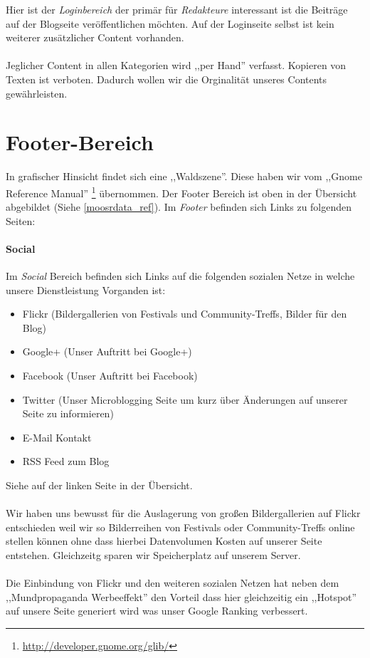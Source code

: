 Hier ist der \emph{Loginbereich} der primär für \emph{Redakteure} interessant
ist die Beiträge auf der Blogseite veröffentlichen möchten. Auf der Loginseite
selbst ist kein weiterer zusätzlicher Content vorhanden.
\\
\\
Jeglicher Content in allen Kategorien wird ,,per Hand'' verfasst. Kopieren von
Texten ist verboten. Dadurch wollen wir die Orginalität unseres Contents
gewährleisten.

\section{Footer-Bereich}
In grafischer Hinsicht findet sich eine ,,Waldszene''. Diese haben wir vom 
,,Gnome Reference Manual'' \footnote{\url{http://developer.gnome.org/glib/}} übernommen.
Der Footer Bereich ist oben in der Übersicht abgebildet (Siehe
\ref{moosrdata_ref}).
Im \emph{Footer} befinden sich Links zu folgenden Seiten:

\paragraph{Social}
Im \emph{Social} Bereich befinden sich Links auf die folgenden sozialen Netze in
welche unsere Dienstleistung Vorganden ist:
\begin{itemize}
\item Flickr (Bildergallerien von Festivals und Community-Treffs, Bilder für den
    Blog)
\item Google+ (Unser Auftritt bei Google+)
\item Facebook (Unser Auftritt bei Facebook)
\item Twitter (Unser Microblogging Seite um kurz über Änderungen auf unserer
Seite zu informieren)
\item E-Mail Kontakt
\item RSS Feed zum Blog
\end{itemize}

Siehe auf der linken Seite in der Übersicht.
\\
\\
Wir haben uns bewusst für die Auslagerung von großen Bildergallerien auf Flickr
entschieden weil wir so Bilderreihen von Festivals oder Community-Treffs online
stellen können ohne dass hierbei Datenvolumen Kosten auf unserer Seite
entstehen. Gleichzeitg sparen wir Speicherplatz auf unserem Server.
\\
\\
Die Einbindung von Flickr und den weiteren sozialen Netzen hat neben dem
,,Mundpropaganda Werbeeffekt'' den Vorteil dass hier gleichzeitig ein
,,Hotspot'' auf unsere Seite generiert wird was unser Google Ranking verbessert.

